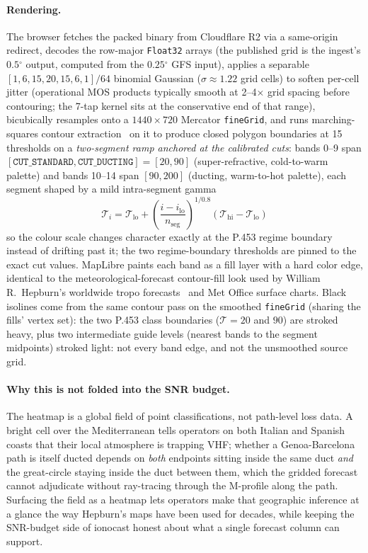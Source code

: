 \documentclass[11pt,a4paper]{article}
\newcommand{\degree}{\ensuremath{{}^\circ}}
\begin{document}
\paragraph{Rendering.} The browser fetches the packed binary from
Cloudflare R2 via a same-origin redirect, decodes the row-major
\texttt{Float32} arrays (the published grid is the ingest's
$0.5\degree$ output, computed from the $0.25\degree$ GFS input),
applies a separable
$[1,6,15,20,15,6,1]/64$ binomial Gaussian ($\sigma \approx 1.22$
grid cells) to soften per-cell jitter
(operational MOS products typically smooth at 2--4$\times$ grid
spacing before contouring; the 7-tap kernel sits at the
conservative end of that range), bicubically resamples onto a
$1440 \times 720$ Mercator \texttt{fineGrid}, and runs
marching-squares contour
extraction~\cite{d3contour} on it to produce closed polygon
boundaries at 15 thresholds on a \emph{two-segment ramp anchored
at the calibrated cuts}: bands 0--9 span
$[\texttt{CUT\_STANDARD}, \texttt{CUT\_DUCTING}] = [20, 90]$
(super-refractive, cold-to-warm palette) and bands 10--14 span
$[90, 200]$ (ducting, warm-to-hot palette), each segment shaped
by a mild intra-segment gamma
\begin{equation}
  \mathcal{T}_i = \mathcal{T}_{\text{lo}} +
    \left(\frac{i - i_{\text{lo}}}{n_{\text{seg}}}\right)^{\!1/0.8}\!
    (\mathcal{T}_{\text{hi}} - \mathcal{T}_{\text{lo}})
\end{equation}
so the colour scale changes character exactly at the P.453 regime
boundary instead of drifting past it; the two regime-boundary
thresholds are pinned to the exact cut values.  MapLibre paints
each band as a fill
layer with a hard color edge, identical to the
meteorological-forecast contour-fill look used by William R.\
Hepburn's worldwide tropo forecasts~\cite{hepburntropo} and Met
Office surface charts.  Black isolines come from the same contour
pass on the smoothed \texttt{fineGrid} (sharing the fills' vertex
set): the two P.453 class boundaries ($\mathcal{T} = 20$ and
$90$) are stroked heavy, plus two intermediate guide levels
(nearest bands to the segment midpoints) stroked light: not
every band edge, and not the unsmoothed source grid.

\paragraph{Why this is not folded into the SNR budget.} The heatmap
is a global field of point classifications, not path-level loss
data.  A bright cell over the Mediterranean tells operators on
both Italian and Spanish coasts that their local atmosphere is
trapping VHF; whether a Genoa-Barcelona path is itself ducted
depends on \emph{both} endpoints sitting inside the same duct
\emph{and} the great-circle staying inside the duct between them,
which the gridded forecast cannot adjudicate without ray-tracing
through the M-profile along the path.  Surfacing the field as a
heatmap lets operators make that geographic inference at a glance
the way Hepburn's maps have been used for decades, while keeping
the SNR-budget side of ionocast honest about what a single forecast
column can support.
\end{document}
